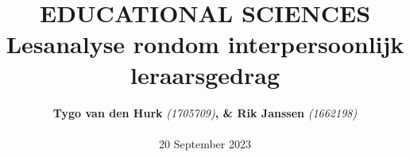 \documentclass{article}
\begin{document}
    \title{ 
        \normalsize 
        \textsc{} \\
        [2.0cm]
        \HRule{1.5pt} \\
        \LARGE \textbf{
            \uppercase{
             Educational sciences}
        \HRule{2.0pt} \\ 
        [0.6cm] 
        \LARGE{
            Lesanalyse rondom interpersoonlijk leraarsgedrag} 
        \vspace*{
            10\baselineskip}}}
    \date{}
    \author{
        \textbf{Tygo van den Hurk} \textit{(1705709)}\textbf{, \& Rik Janssen} 
        \textit{(1662198)} \\ 
        \\
        20 September 2023}
    \maketitle
    \newpage
    \tableofcontents
    \newpage
\end{document}
